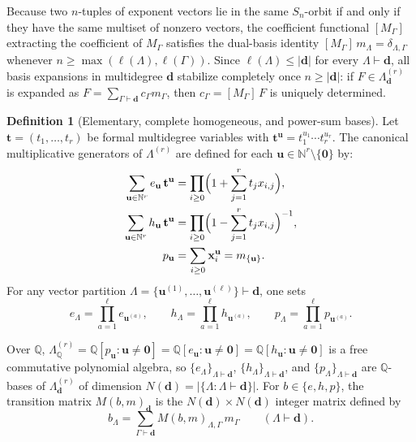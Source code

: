 \documentclass[11pt,a4paper]{article}
\theoremstyle{definition}
\newtheorem{definition}[theorem]{Definition}
\theoremstyle{remark}
\newcommand{\NN}{\mathbb{N}}
\newcommand{\QQ}{\mathbb{Q}}
\newcommand{\vecd}{\mathbf{d}}
\newcommand{\vecu}{\mathbf{u}}
\newcommand{\vecx}{\mathbf{x}}
\newcommand{\vect}{\mathbf{t}}
\begin{document}
Because two $n$-tuples of exponent vectors lie in the same $S_n$-orbit if and only if they have the same multiset of nonzero vectors, the coefficient functional $[M_\Gamma]$ extracting the coefficient of $M_\Gamma$ satisfies the dual-basis identity $[M_\Gamma]\, m_\Lambda = \delta_{\Lambda,\Gamma}$ whenever $n \ge \max(\ell(\Lambda), \ell(\Gamma))$. Since $\ell(\Lambda) \le |\vecd|$ for every $\Lambda \vdash \vecd$, all basis expansions in multidegree $\vecd$ stabilize completely once $n \ge |\vecd|$: if $F \in \Lambda^{(r)}_{\vecd}$ is expanded as $F = \sum_{\Gamma \vdash \vecd} c_\Gamma m_\Gamma$, then $c_\Gamma = [M_\Gamma]\, F$ is uniquely determined.

\begin{definition}[Elementary, complete homogeneous, and power-sum bases]
Let $\vect = (t_1, \dots, t_r)$ be formal multidegree variables with $\vect^{\vecu} = t_1^{u_1}\cdots t_r^{u_r}$. The canonical multiplicative generators of $\Lambda^{(r)}$ are defined for each $\vecu \in \NN^r \setminus \{\mathbf{0}\}$ by:
\begin{align}
  \sum_{\vecu \in \NN^r} e_{\vecu}\, \vect^{\vecu} &= \prod_{i \ge 0} \Bigl(1 + \sum_{j=1}^r t_j x_{i,j}\Bigr), \label{eq:gen-e}\\
  \sum_{\vecu \in \NN^r} h_{\vecu}\, \vect^{\vecu} &= \prod_{i \ge 0} \Bigl(1 - \sum_{j=1}^r t_j x_{i,j}\Bigr)^{-1}, \label{eq:gen-h}\\
  p_{\vecu} &= \sum_{i \ge 0} \vecx_i^{\vecu} = m_{\{\vecu\}}. \label{eq:gen-p}
\end{align}
For any vector partition $\Lambda = \{\vecu^{(1)}, \dots, \vecu^{(\ell)}\} \vdash \vecd$, one sets
\[
  e_\Lambda = \prod_{a=1}^\ell e_{\vecu^{(a)}}, \qquad
  h_\Lambda = \prod_{a=1}^\ell h_{\vecu^{(a)}}, \qquad
  p_\Lambda = \prod_{a=1}^\ell p_{\vecu^{(a)}}.
\]
\end{definition}

Over $\QQ$, $\Lambda^{(r)}_{\QQ} = \QQ[p_{\vecu} : \vecu \neq \mathbf{0}] = \QQ[e_{\vecu} : \vecu \neq \mathbf{0}] = \QQ[h_{\vecu} : \vecu \neq \mathbf{0}]$ is a free commutative polynomial algebra, so $\{e_\Lambda\}_{\Lambda \vdash \vecd}$, $\{h_\Lambda\}_{\Lambda \vdash \vecd}$, and $\{p_\Lambda\}_{\Lambda \vdash \vecd}$ are $\QQ$-bases of $\Lambda^{(r)}_{\vecd}$ of dimension $N(\vecd) = |\{\Lambda : \Lambda \vdash \vecd\}|$. For $b \in \{e, h, p\}$, the transition matrix $M(b,m)_{\vecd}$ is the $N(\vecd) \times N(\vecd)$ integer matrix defined by
\[
  b_\Lambda = \sum_{\Gamma \vdash \vecd} M(b,m)_{\Lambda,\Gamma}\, m_\Gamma \qquad (\Lambda \vdash \vecd).
\]
\end{document}
